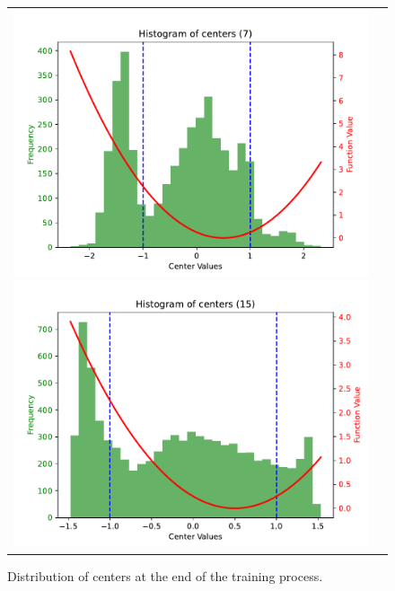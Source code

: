 \documentclass[12pt]{report} %
\begin{document}
\begin{figure}[h]
  \hspace*{-3.5cm}
  \begin{tabular}{cc}
    \includegraphics[width=.7\textwidth]{imagenes/experiments/1d/statistical_1d_full_scheduler_interpolation/histogram-centers-C7.pdf}
    {\includegraphics[width=.7\textwidth]{imagenes/experiments/1d/statistical_1d_full_scheduler_interpolation/histogram-centers-C15.pdf}  }
  \end{tabular}
  \caption{Distribution of centers at the end of the training process.}
  \label{fig:u2-results-centers}
\end{figure}
\end{document}

